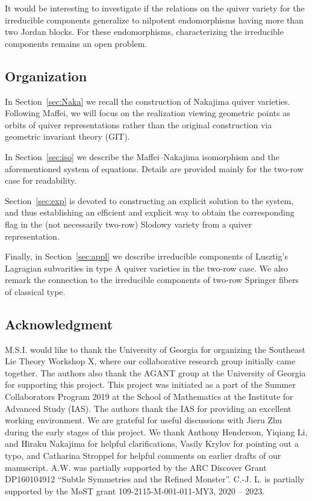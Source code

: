 \documentclass[11pt,reqno]{amsart}
\numberwithin{equation}{section}
\theoremstyle{definition}
\begin{document}
It would be interesting to investigate if the relations on the quiver variety for the irreducible components generalize to nilpotent endomorphisms having more than two Jordan blocks. For these endomorphisms, characterizing the irreducible components remains an open problem.     
 
\subsection{Organization}
In Section~\ref{sec:Naka} we recall the construction of Nakajima quiver varieties.
Following Maffei, we will focus on the realization viewing geometric points as orbits of quiver representations rather than the original construction via geometric invariant theory (GIT).

In Section~\ref{sec:iso} we describe the Maffei--Nakajima isomorphism and the aforementioned system of equations. Details are provided mainly for the two-row case for readability.

Section~\ref{sec:exp} is devoted to constructing an explicit solution to the system, and thus establishing an efficient and explicit way to obtain the corresponding flag in the (not necessarily two-row) Slodowy variety from a quiver representation.

Finally, in Section~\ref{sec:appl} we describe irreducible components of Lusztig's Lagragian subvarities in type A quiver varieties in the two-row case. We also remark the connection to the irreducible components of two-row Springer fibers of classical type.




\subsection*{Acknowledgment}
M.S.I. would like to thank the University of Georgia for organizing the Southeast Lie Theory Workshop X, where our collaborative research group initially came together. 
The authors also thank the AGANT group at the University of Georgia for supporting this project. 
This project was initiated as a part of the Summer Collaborators Program 2019 at the School of Mathematics at the Institute for Advanced Study (IAS). The authors thank the IAS for providing an excellent working environment.
We are grateful for useful discussions with Jieru Zhu during the early stages of this project. 
We thank Anthony Henderson, Yiqiang Li, and Hiraku Nakajima for helpful clarifications, Vasily Krylov for pointing out a typo, and Catharina Stroppel for helpful comments on earlier drafts of our manuscript. 
A.W. was  partially supported by the ARC Discover Grant DP160104912 ``Subtle Symmetries and the Refined Monster''.
C.-J. L. is partially supported by the MoST grant 109-2115-M-001-011-MY3, 2020 -- 2023.
\end{document}
